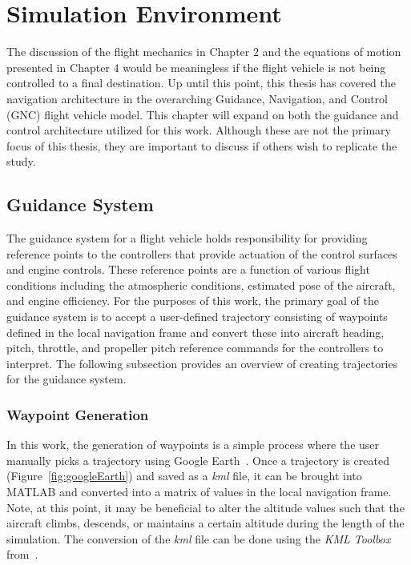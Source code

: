 \chapter{Simulation Environment}
The discussion of the flight mechanics in Chapter 2 and the equations of motion presented in Chapter 4 would be meaningless if the flight vehicle is not being controlled to a final destination. Up until this point, this thesis has covered the navigation architecture in the overarching Guidance, Navigation, and Control (GNC) flight vehicle model. This chapter will expand on both the guidance and control architecture utilized for this work. Although these are not the primary focus of this thesis, they are important to discuss if others wish to replicate the study.

\section{\textbf{Guidance System}}
The guidance system for a flight vehicle holds responsibility for providing reference points to the controllers that provide actuation of the control surfaces and engine controls. These reference points are a function of various flight conditions including the atmospheric conditions, estimated pose of the aircraft, and engine efficiency. For the purposes of this work, the primary goal of the guidance system is to accept a user-defined trajectory consisting of waypoints defined in the local navigation frame and convert these into aircraft heading, pitch, throttle, and propeller pitch reference commands for the controllers to interpret. The following subsection provides an overview of creating trajectories for the guidance system.

\subsection{\textbf{Waypoint Generation}}
In this work, the generation of waypoints is a simple process where the user manually picks a trajectory using Google Earth~\cite{GoogleEarth1969}. Once a trajectory is created (Figure~\ref{fig:googleEarth}) and saved as a \textit{kml} file, it can be brought into MATLAB and converted into a matrix of values in the local navigation frame. Note, at this point, it may be beneficial to alter the altitude values such that the aircraft climbs, descends, or maintains a certain altitude during the length of the simulation. The conversion of the \textit{kml} file can be done using the \textit{KML Toolbox} from~\cite{KMLToolboxFile1969}.


